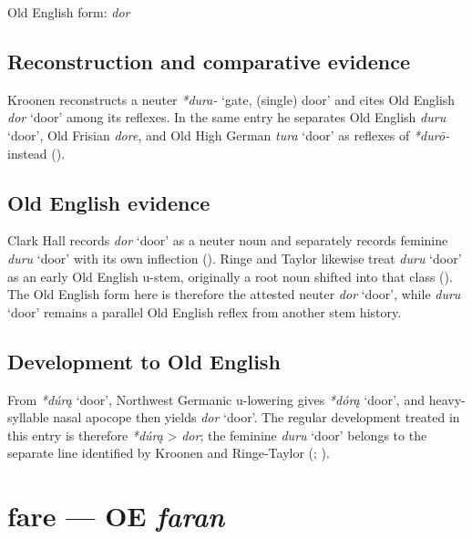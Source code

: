 \documentclass[
  british,
  a4paper,
  openany]{book}
\providecommand{\Recon}[1]{\emph{*#1}}
{\catcode`→=\active \global\def→{\ensuremath{\rightarrow}}}
\providecommand{\texorpdfstring}[2]{#1}
\providecommand{\Recon}[1]{\emph{*#1}}
{\catcode`→=\active \global\def→{\ensuremath{\rightarrow}}}
\begin{document}
Old English form: \emph{dor}

\subsection{Reconstruction and comparative
evidence}\label{reconstruction-and-comparative-evidence-13}

Kroonen reconstructs a neuter \emph{*dura-} `gate, (single) door' and
cites Old English {\emph{dor}} `door' among its reflexes. In the same
entry he separates Old English {\emph{duru}} `door', Old Frisian
\emph{dore}, and Old High German {\emph{tura}} `door' as reflexes of
\emph{*durō-} instead ().

\subsection{Old English evidence}\label{old-english-evidence-13}

Clark Hall records {\emph{dor}} `door' as a neuter noun and separately
records feminine {\emph{duru}} `door' with its own inflection
(). Ringe and Taylor
likewise treat {\emph{duru}} `door' as an early Old English u-stem,
originally a root noun shifted into that class
(). The Old English
form here is therefore the attested neuter {\emph{dor}} `door', while
{\emph{duru}} `door' remains a parallel Old English reflex from another
stem history.

\subsection{Development to Old
English}\label{development-to-old-english-13}

From \Recon{dúrą} `door', Northwest Germanic u-lowering gives
\Recon{dórą} `door', and heavy-syllable nasal apocope then yields
{\emph{dor}} `door'. The regular development treated in this entry is
therefore \emph{*dúrą} \textgreater{} \emph{dor}; the feminine
{\emph{duru}} `door' belongs to the separate line identified by Kroonen
and Ringe-Taylor (;
).

\section{\texorpdfstring{fare --- OE
\emph{faran}}{fare --- OE faran}}\label{fare-oe-faran}
\end{document}

